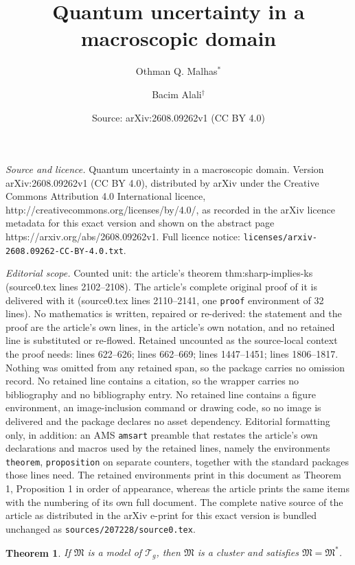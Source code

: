 \documentclass[10pt,a4paper]{amsart}
\title{Quantum uncertainty in a macroscopic domain}
\author{Othman Q. Malhas$^*$ \and Bacim Alali$^\dag$}
\date{Source: arXiv:2608.09262v1 (CC BY 4.0)}
\newtheorem{theorem}{Theorem}
\begin{document}
\maketitle

\noindent\emph{Source and licence.} Quantum uncertainty in a macroscopic domain. Version arXiv:2608.09262v1 (CC BY 4.0), distributed by arXiv under the Creative Commons Attribution 4.0 International licence, http://creativecommons.org/licenses/by/4.0/, as recorded in the arXiv licence metadata for this exact version and shown on the abstract page https://arxiv.org/abs/2608.09262v1. Full licence notice: \texttt{licenses/arxiv-2608.09262-CC-BY-4.0.txt}.\par\smallskip

\noindent\textit{Editorial scope.} Counted unit: the article's theorem thm:sharp-implies-ks (source0.tex lines 2102--2108). The article's complete original proof of it is delivered with it (source0.tex lines 2110--2141, one \texttt{proof} environment of 32 lines). No mathematics is written, repaired or re-derived: the statement and the proof are the article's own lines, in the article's own notation, and no retained line is substituted or re-flowed.  Retained uncounted as the source-local context the proof needs: lines 622--626; lines 662--669; lines 1447--1451; lines 1806--1817.  Nothing was omitted from any retained span, so the package carries no omission record.  No retained line contains a citation, so the wrapper carries no bibliography and no bibliography entry.  No retained line contains a figure environment, an image-inclusion command or drawing code, so no image is delivered and the package declares no asset dependency.  Editorial formatting only, in addition: an AMS \texttt{amsart} preamble that restates the article's own declarations and macros used by the retained lines, namely the environments \texttt{theorem}, \texttt{proposition} on separate counters, together with the standard packages those lines need.  The retained environments print in this document as Theorem 1, Proposition 1 in order of appearance, whereas the article prints the same items with the numbering of its own full document.  The complete native source of the article as distributed in the arXiv e-print for this exact version is bundled unchanged as \texttt{sources/207228/source0.tex}.
\begin{theorem}
\label{thm:models-are-clusters}
If $\mathfrak M$ is a model of $\mathcal T_g$, then $\mathfrak M$ is a cluster
and satisfies $\mathfrak M=\mathfrak M^*$.
\end{theorem}
\end{document}
